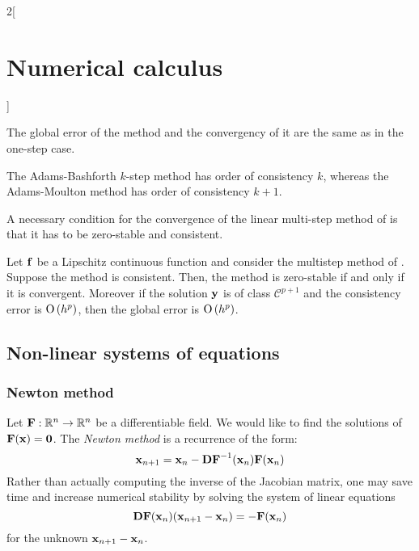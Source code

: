 \documentclass[../../../main_math.tex]{subfiles}
\begin{document}
\begin{multicols}{2}[\section{Numerical calculus}]
\begin{definition}
  \end{definition}
  \begin{remark}
    The global error of the method and the convergency of it are the same as in the one-step case.
  \end{remark}
  \begin{proposition}
    The Adams-Bashforth $k$-step method has order of consistency $k$, whereas the Adams-Moulton method has order of consistency $k+1$.
  \end{proposition}
  \begin{theorem}
    A necessary condition for the convergence of the linear multi-step method of  is that it has to be zero-stable and consistent.
  \end{theorem}
  \begin{theorem}
    Let $\boldsymbol{\mathrm{f}}$ be a Lipschitz continuous function and consider the multistep method of . Suppose the method is consistent. Then, the method is zero-stable if and only if it is convergent. Moreover if the solution $\boldsymbol{\mathrm{y}}$ is of class $\mathcal{C}^{p+1}$ and the consistency error is $\mathrm{O}\left(h^p\right)$, then the global error is $\mathrm{O}\left(h^{p}\right)$.
  \end{theorem}
  \subsection{Non-linear systems of equations}
  \subsubsection{Newton method}
  \begin{definition}
    Let $\boldsymbol{\mathrm{F}}:\mathbb{R}^n\rightarrow\mathbb{R}^n$ be a differentiable field. We would like to find the solutions of $\boldsymbol{\mathrm{F}}(\boldsymbol{\mathrm{x}})=\boldsymbol{\mathrm{0}}$.
    The \emph{Newton method} is a recurrence of the form:
    \begin{equation*}
      \boldsymbol{\mathrm{x}}_{n+1}=\boldsymbol{\mathrm{x}}_n-\boldsymbol{\mathrm{DF}}^{-1}(\boldsymbol{\mathrm{x}}_n)\boldsymbol{\mathrm{F}}(\boldsymbol{\mathrm{x}}_n)
    \end{equation*}
    Rather than actually computing the inverse of the Jacobian matrix, one may save time and increase numerical stability by solving the system of linear equations
    $$
      \boldsymbol{\mathrm{DF}}(\boldsymbol{\mathrm{x}}_n)(\boldsymbol{\mathrm{x}}_{n+1}-\boldsymbol{\mathrm{x}}_n)=-\boldsymbol{\mathrm{F}}(\boldsymbol{\mathrm{x}}_n)
    $$
    for the unknown $\boldsymbol{\mathrm{x}}_{n+1}-\boldsymbol{\mathrm{x}}_n$.
  \end{definition}
\end{multicols}
\end{document}
